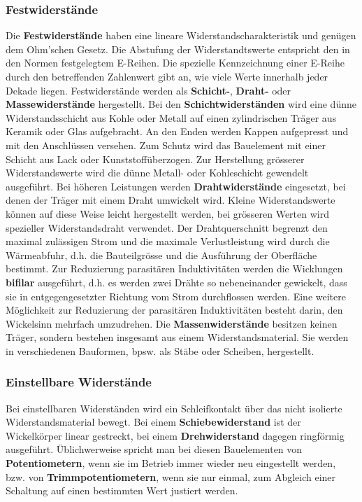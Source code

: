 \subsubsection{Festwiderstände}
Die \textbf{Festwiderstände} haben eine lineare Widerstandscharakteristik und genügen dem Ohm'schen Gesetz. Die Abstufung der Widerstandtswerte entspricht den in den Normen festgelegtem E-Reihen. Die spezielle Kennzeichnung einer E-Reihe durch den betreffenden Zahlenwert gibt an, wie viele Werte innerhalb jeder Dekade liegen. Festwiderstände werden als \textbf{Schicht-}, \textbf{Draht-} oder \textbf{Massewiderstände} hergestellt.
\newline\newline
Bei den \textbf{Schichtwiderständen} wird eine dünne Widerstandsschicht aus Kohle oder Metall auf einen zylindrischen Träger aus Keramik oder Glas aufgebracht. An den Enden werden Kappen aufgepresst und mit den Anschlüssen versehen. Zum Schutz wird das Bauelement mit einer Schicht aus Lack oder Kunststoffüberzogen. Zur Herstellung grösserer Widerstandswerte wird die dünne Metall- oder Kohleschicht gewendelt ausgeführt.
\newline\newline
Bei höheren Leistungen werden \textbf{Drahtwiderstände} eingesetzt, bei denen der Träger mit einem Draht umwickelt wird. Kleine Widerstandswerte können auf diese Weise leicht hergestellt werden, bei grösseren Werten wird spezieller Widerstandsdraht verwendet. Der Drahtquerschnitt begrenzt den maximal zulässigen Strom und die maximale Verlustleistung wird durch die Wärmeabfuhr, d.h. die Bauteilgrösse und die Ausführung der Oberfläche bestimmt. Zur Reduzierung parasitären Induktivitäten werden die Wicklungen \textbf{bifilar} ausgeführt, d.h. es werden zwei Drähte so nebeneinander gewickelt, dass sie in entgegengesetzter Richtung vom Strom durchflossen werden. Eine weitere Möglichkeit zur Reduzierung der parasitären Induktivitäten besteht darin, den Wickelsinn mehrfach umzudrehen.
\newline\newline
Die \textbf{Massenwiderstände} besitzen keinen Träger, sondern bestehen insgesamt aus einem Widerstandsmaterial. Sie werden in verschiedenen Bauformen, bpsw. als Stäbe oder Scheiben, hergestellt.
\subsubsection{Einstellbare Widerstände}
Bei einstellbaren Widerständen wird ein Schleifkontakt über das nicht isolierte Widerstandsmaterial bewegt. Bei einem \textbf{Schiebewiderstand} ist der Wickelkörper linear gestreckt, bei einem \textbf{Drehwiderstand} dagegen ringförmig ausgeführt. Üblichwerweise spricht man bei diesen Bauelementen von \textbf{Potentiometern}, wenn sie im Betrieb immer wieder neu eingestellt werden, bzw. von \textbf{Trimmpotentiometern}, wenn sie nur einmal, zum Abgleich einer Schaltung auf einen bestimmten Wert justiert werden.
